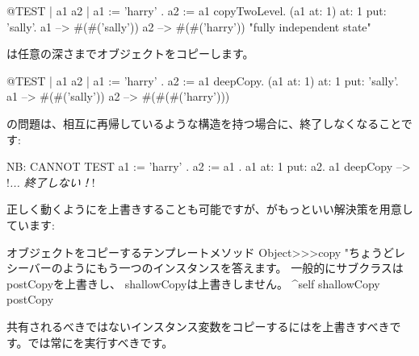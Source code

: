 \documentclass[a4paper,10pt,twoside]{book}
\begin{document}
\begin{code}{@TEST | a1 a2 |}
a1 := { { 'harry' } } .
a2 := a1 copyTwoLevel.
(a1 at: 1) at: 1 put: 'sally'.
a1 --> #(#('sally'))
a2 --> #(#('harry'))    "fully independent state"
\end{code}

は任意の深さまでオブジェクトをコピーします。

\begin{code}{@TEST | a1 a2 |}
a1 := { { { 'harry' } } } .
a2 := a1 deepCopy.
(a1 at: 1) at: 1 put: 'sally'.
a1 --> #(#('sally'))
a2 --> #(#(#('harry')))
\end{code}

の問題は、相互に再帰しているような構造を持つ場合に、終了しなくなることです:

\begin{code}{NB: CANNOT TEST}
a1 := { 'harry' }.
a2 := { a1 }.
a1 at: 1 put: a2.
a1 deepCopy --> !\emph{... 終了しない！}!
\end{code}

正しく動くようにを上書きすることも可能ですが、がもっといい解決策を用意しています:

\begin{method}{オブジェクトをコピーするテンプレートメソッド}
Object>>>copy
    "ちょうどレシーバーのようにもう一つのインスタンスを答えます。
    一般的にサブクラスはpostCopyを上書きし、
    shallowCopyは上書きしません。
    ^self shallowCopy postCopy
\end{method}

共有されるべきではないインスタンス変数をコピーするにはを上書きすべきです。では常にを実行すべきです。
\end{document}
